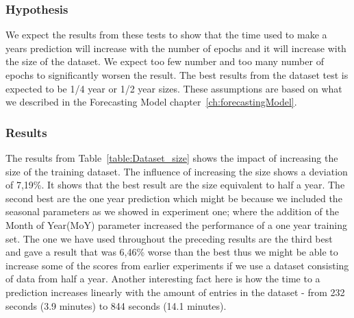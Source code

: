 \subsubsection{Hypothesis}
We expect the results from these tests to show that the time used to make a years prediction will increase with the number of epochs and it will increase with the size of the dataset. We expect too few number and too many number of epochs to significantly worsen the result. The best results from the dataset test is expected to be 1/4 year or 1/2 year sizes. These assumptions are based on what we described in the Forecasting Model chapter~\ref{ch:forecastingModel}.

\subsubsection{Results}
The results from Table~\ref{table:Dataset_size} shows the impact of increasing the size of the training dataset. The influence of increasing the size shows a deviation of 7,19\%. It shows that the best result are the size equivalent to half a year. The second best are the one year prediction which might be because we included the seasonal parameters as we showed in experiment one; where the addition of the Month of Year(MoY) parameter increased the performance of a one year training set. The one we have used throughout the preceding results are the third best and gave a result that was 6,46\% worse than the best thus we might be able to increase some of the scores from earlier experiments if we use a dataset consisting of data from half a year. Another interesting fact here is how the time to a prediction increases linearly with the amount of entries in the dataset - from 232 seconds (3.9 minutes) to 844 seconds (14.1 minutes).

\begin{table}[H]
\centering  %
\caption{The results from the dataset size test.} %
\label{table:Dataset_size} %
\end{table}

